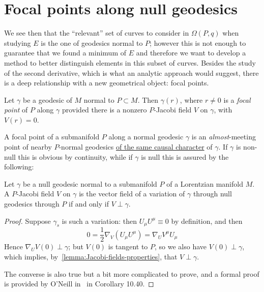 \section{Focal points along null geodesics}
\label{sec:fp-index-forms}
We see then that the ``relevant'' set of curves to consider in \(\Omega(P, q)\) when studying \(E\) is the one of geodesics normal to \(P\); however this is not enough to guarantee that we found a minimum of \(E\) and therefore we want to develop a method to better distinguish elements in this subset of curves. Besides the study of the second derivative, which is what an analytic approach would suggest, there is a deep relationship with a new geometrical object: focal points.

\vskip 4pt

\begin{definition}
	Let \(\gamma\) be a geodesic of \(M\) normal to \(P \subset M\). Then \(\gamma(r)\), where \(r \neq 0\) is a \emph{focal point} of \(P\) along \(\gamma\) provided there is a nonzero \(P\)-Jacobi field \(V\) on \(\gamma\), with \(V(r) = 0\).
\end{definition}

A focal point of a submanifold \(P\) along a normal geodesic \(\gamma\) is an \emph{almost}-meeting point of nearby \(P\)-normal geodesics \underline{of the same causal character} of \(\gamma\). If \(\gamma\) is non-null this is obvious by continuity, while if \(\gamma\) is null this is assured by the following:
\begin{corollary}
	\label{cor:same-causal-character}
	Let \(\gamma\) be a null geodesic normal to a submanifold \(P\) of a Lorentzian manifold \(M\). A \(P\)-Jacobi field \(V\) on \(\gamma\) is the vector field of a variation of \(\gamma\) through null geodesics through \(P\) if and only if \(V \perp \gamma\).
\end{corollary}

\begin{proof}
	Suppose \(\gamma_s\) is such a variation: then \(U_{\mu}U^{\mu}\equiv 0\) by definition, and then
	\[
	0 = \frac{1}{2}\nabla_V(U_{\mu}U^{\mu}) = \nabla_UV^{\mu}U_{\mu}
	\]
	Hence \(\nabla_UV(0) \perp \gamma\); but \(V(0)\) is tangent to \(P\), so we also have \(V(0) \perp \gamma\), which implies, by~\ref{lemma:Jacobi-fields-properties}, that \(V \perp \gamma\).
	
	The converse is also true but a bit more complicated to prove, and a formal proof is provided by O'Neill in~\cite{o1983semi} in Corollary 10.40.
\end{proof}

